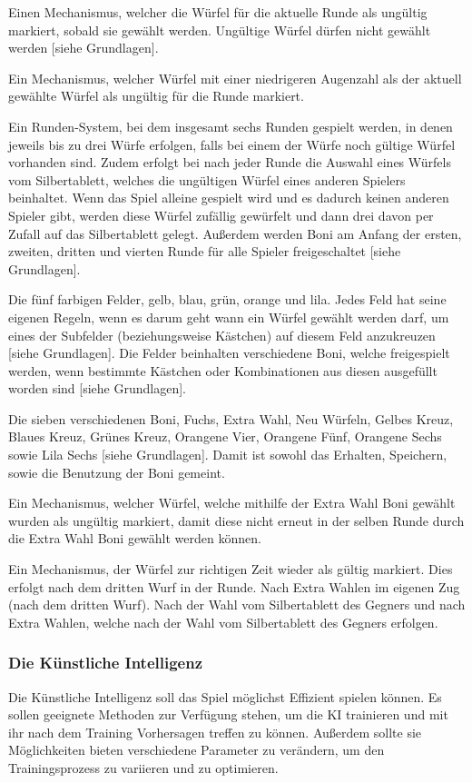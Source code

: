 Einen Mechanismus, welcher die Würfel für die aktuelle Runde als ungültig markiert, sobald sie gewählt werden. Ungültige Würfel dürfen nicht gewählt werden [siehe Grundlagen].

Ein Mechanismus, welcher Würfel mit einer niedrigeren Augenzahl als der aktuell gewählte Würfel als ungültig für die Runde markiert.

Ein Runden-System, bei dem insgesamt sechs Runden gespielt werden, in denen jeweils bis zu drei Würfe erfolgen, falls bei einem der Würfe noch gültige Würfel vorhanden sind. Zudem erfolgt bei nach jeder Runde die Auswahl eines Würfels vom Silbertablett, welches die ungültigen Würfel eines anderen Spielers beinhaltet. Wenn das Spiel alleine gespielt wird und es dadurch keinen anderen Spieler gibt, werden diese Würfel zufällig gewürfelt und dann drei davon per Zufall auf das Silbertablett gelegt. Außerdem werden Boni am Anfang der ersten, zweiten, dritten und vierten Runde für alle Spieler freigeschaltet [siehe Grundlagen].

Die fünf farbigen Felder, gelb, blau, grün, orange und lila. Jedes Feld hat seine eigenen Regeln, wenn es darum geht wann ein Würfel gewählt werden darf, um eines der Subfelder (beziehungsweise Kästchen) auf diesem Feld anzukreuzen [siehe Grundlagen]. Die Felder beinhalten verschiedene Boni, welche freigespielt werden, wenn bestimmte Kästchen oder Kombinationen aus diesen ausgefüllt worden sind [siehe Grundlagen].

Die sieben verschiedenen Boni, Fuchs, Extra Wahl, Neu Würfeln, Gelbes Kreuz, Blaues Kreuz, Grünes Kreuz, Orangene Vier, Orangene Fünf, Orangene Sechs sowie Lila Sechs [siehe Grundlagen]. Damit ist sowohl das Erhalten, Speichern, sowie die Benutzung der Boni gemeint.

Ein Mechanismus, welcher Würfel, welche mithilfe der Extra Wahl Boni gewählt wurden als ungültig markiert, damit diese nicht erneut in der selben Runde durch die Extra Wahl Boni gewählt werden können.

Ein Mechanismus, der Würfel zur richtigen Zeit wieder als gültig markiert. Dies erfolgt nach dem dritten Wurf in der Runde. Nach Extra Wahlen im eigenen Zug (nach dem dritten Wurf). Nach der Wahl vom Silbertablett des Gegners und nach Extra Wahlen, welche nach der Wahl vom Silbertablett des Gegners erfolgen.
\subsubsection{Die Künstliche Intelligenz}
Die Künstliche Intelligenz soll das Spiel möglichst Effizient spielen können. Es sollen geeignete Methoden zur Verfügung stehen, um die KI trainieren und mit ihr nach dem Training Vorhersagen treffen zu können. Außerdem sollte sie Möglichkeiten bieten verschiedene Parameter zu verändern, um den Trainingsprozess zu variieren und zu optimieren. 


